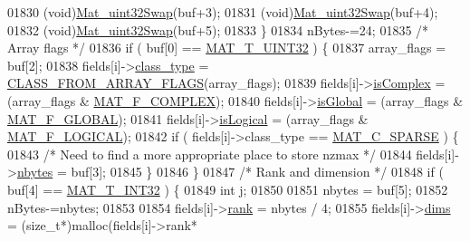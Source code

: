 \begin{DoxyCode}
{{{{{{{{{{{{{{{{01830                 (void)\hyperlink{endian_8c_a8cb0d0750e2eaf9840d95db531934f4f}{Mat\_uint32Swap}(buf+3);
01831                 (void)\hyperlink{endian_8c_a8cb0d0750e2eaf9840d95db531934f4f}{Mat\_uint32Swap}(buf+4);
01832                 (void)\hyperlink{endian_8c_a8cb0d0750e2eaf9840d95db531934f4f}{Mat\_uint32Swap}(buf+5);
01833             \}
01834             nBytes-=24;
01835             \textcolor{comment}{/* Array flags */}
01836             \textcolor{keywordflow}{if} ( buf[0] == \hyperlink{group___m_a_t_ggacf7b3b879282b7ab3a51190e49bf3453aa397e285a23fe240368b752897652c6a}{MAT\_T\_UINT32} ) \{
01837                array\_flags = buf[2];
01838                fields[i]->\hyperlink{group___m_a_t_aff13035bf3265dd7d9425e5d40c839d4}{class\_type} = \hyperlink{mat5_8c_a85a616d27707e89bda9fd2e9bbb6a586}{CLASS\_FROM\_ARRAY\_FLAGS}(array\_flags);
01839                fields[i]->\hyperlink{group___m_a_t_aeb03b3a69f108dc05470b00443a43739}{isComplex}  = (array\_flags & \hyperlink{group___m_a_t_ggab9d6ef9e3ddca78a317b173f01d53fbbacd7b091a11184aad7fc6078c04470780}{MAT\_F\_COMPLEX});
01840                fields[i]->\hyperlink{group___m_a_t_af26c71c4c0ddb14931d15910dddac1bc}{isGlobal}   = (array\_flags & \hyperlink{group___m_a_t_ggab9d6ef9e3ddca78a317b173f01d53fbba49084e0c796aa7963e53f7539525d40d}{MAT\_F\_GLOBAL});
01841                fields[i]->\hyperlink{group___m_a_t_a866c1539e68073a837833d74cd4a65be}{isLogical}  = (array\_flags & \hyperlink{group___m_a_t_ggab9d6ef9e3ddca78a317b173f01d53fbba57eb5c6e200bcbc0f1b7982f29a169c2}{MAT\_F\_LOGICAL});
01842                \textcolor{keywordflow}{if} ( fields[i]->class\_type == \hyperlink{group___m_a_t_ggad4d60ae7b709fc81bfd744fb4c857c40a0d5655b7e6178a2242cb3bb56ff4c8d2}{MAT\_C\_SPARSE} ) \{
01843                    \textcolor{comment}{/* Need to find a more appropriate place to store nzmax */}
01844                    fields[i]->\hyperlink{group___m_a_t_abf1c844540503be2df9bb3db93cfe307}{nbytes} = buf[3];
01845                \}
01846             \}
01847             \textcolor{comment}{/* Rank and dimension */}
01848             \textcolor{keywordflow}{if} ( buf[4] == \hyperlink{group___m_a_t_ggacf7b3b879282b7ab3a51190e49bf3453a83e06a68320726c6572bfbb9f3addb1d}{MAT\_T\_INT32} ) \{
01849                 \textcolor{keywordtype}{int} j;
01850 
01851                 nbytes = buf[5];
01852                 nBytes-=nbytes;
01853 
01854                 fields[i]->\hyperlink{group___m_a_t_a84ba70c96ded13cc555fa75b768d9921}{rank} = nbytes / 4;
01855                 fields[i]->\hyperlink{group___m_a_t_a8e01234e1c862ce3472bb37f5a09b92c}{dims} = (\textcolor{keywordtype}{size\_t}*)malloc(fields[i]->rank*
}}}}}}}}}}}}}}}}
\end{DoxyCode}
